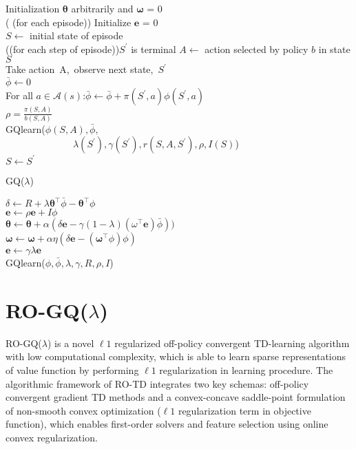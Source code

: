 \documentclass[conference]{IEEEtran}
\makeatletter
\newcommand{\removelatexerror}{\let\@latex@error\@gobble}
\makeatother
\begin{document}
{
\removelatexerror%
\begin{algorithm}[H]
	\textup{Initialization $\pmb{\theta}$ arbitrarily and $\pmb{\omega}$ = 0} \\
	\Repeat({ (for each episode)}){}{
		\textup{Initialize $\pmb{e}$ = 0}\\
		\textup{$S\leftarrow$ initial state of episode}\\
		\Repeat({(for each step of episode)}){\textup{$S^{'}$ is terminal}}{
	  		\textup{$A\leftarrow$ action selected by policy $b$ in state $S$}\\
	  		\textup{Take action}\ A,\ \textup{observe next state,}\ $S^{'}$\\
	  		$\bar{\phi}\leftarrow 0$\\ 
	  \textup{For all $a \in \mathcal{A}(s)$:$\bar{\phi}\leftarrow\bar{\phi}+\pi(S^{'}, a)\phi(S^{'}, a)$}\\
	  $\rho = \frac{\pi(S, A)}{b(S, A)}$\\
	  \textup{GQlearn($\phi(S, A),\bar{\phi},$}\\
	  \textup{\ \ \ \ \ \ \ \ \ \ \ \ \ \ $\lambda(S^{'}),\gamma(S^{'}), r(S, A, S^{'}), \rho, I(S)$)}\\
	  $S\leftarrow S^{'}$
  	}
  	}
	\caption{GQ($\lambda$)}
\end{algorithm}
}
{
\removelatexerror%
\begin{algorithm}[H]
$\delta\leftarrow R+\lambda \pmb{\theta}^{\top} \bar{\phi}-\pmb{\theta}^{\top}\phi$\\
$\pmb{e}\leftarrow \rho \pmb{e} + I \phi$\\
$\pmb{\theta} \leftarrow \pmb{\theta}+ \alpha (\delta \pmb{e} -\gamma(1-\lambda)(\omega^{\top}\pmb{e})\bar{\phi}))$\\
$\pmb{\omega}\leftarrow\pmb{\omega}+\alpha\eta(\delta\pmb{e}-(\pmb{\omega}^{\top}\phi)\phi)$\\
$\pmb{e}\leftarrow\gamma\lambda\pmb{e}$\\
 \caption{GQlearn($\phi,\bar{\phi},\lambda,\gamma, R, \rho, I$)}
\end{algorithm}
}
\section{RO-GQ($\lambda$)}
RO-GQ($\lambda$) is a novel $\ell1$ regularized off-policy convergent TD-learning algorithm with low computational complexity, which is able to learn sparse representations of value function by performing $\ell1$ regularization in learning procedure. The algorithmic framework of RO-TD integrates two key schemas: off-policy convergent gradient TD methods and a convex-concave saddle-point formulation of non-smooth convex optimization ($\ell1$ regularization term in objective function), which enables first-order solvers and feature selection using online convex regularization.
\end{document}
